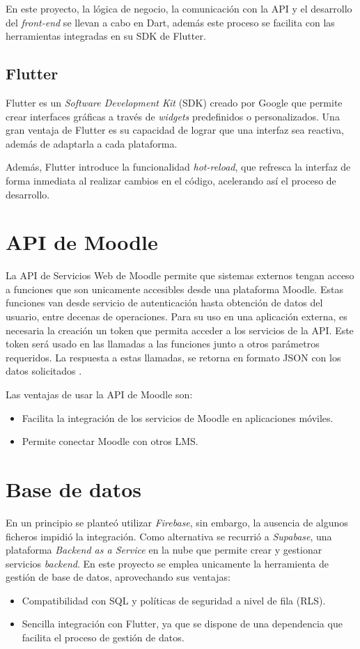 En este proyecto, la lógica de negocio, la comunicación con la API y el desarrollo del \textit{front-end} se llevan a cabo en Dart, además este proceso se facilita con las herramientas integradas en su SDK de Flutter.

\subsection{Flutter}

Flutter es un \textit{Software Development Kit} (SDK) creado por Google que permite crear interfaces gráficas a través de \textit{widgets} predefinidos o personalizados. Una gran ventaja de Flutter es su capacidad de lograr que una interfaz sea reactiva, además de adaptarla a cada plataforma.\cite{flutter}

Además, Flutter introduce la funcionalidad \textit{hot-reload}, que refresca la interfaz de forma inmediata al realizar cambios en el código, acelerando así el proceso de desarrollo.

\section{API de Moodle}
La API de Servicios Web de Moodle permite que sistemas externos tengan acceso a funciones que son unicamente accesibles desde una plataforma Moodle. Estas funciones van desde servicio de autenticación hasta obtención de datos del usuario, entre decenas de operaciones. Para su uso en una aplicación externa, es necesaria la creación un token que permita acceder a los servicios de la API. Este token será usado en las llamadas a las funciones junto a otros parámetros requeridos. La respuesta a estas llamadas, se retorna en formato JSON con los datos solicitados \cite{api_moodle}.

Las ventajas de usar la API de Moodle son:
\begin{itemize}
    \item Facilita la integración de los servicios de Moodle en aplicaciones móviles.
    \item Permite conectar Moodle con otros LMS.
\end{itemize}

\section{Base de datos}
En un principio se planteó utilizar \textit{Firebase}, sin embargo, la ausencia de algunos ficheros impidió la integración. Como alternativa se recurrió a \textit{Supabase}, una plataforma \textit{Backend as a Service} en la nube que permite crear y gestionar servicios \textit{backend}.
En este proyecto se emplea unicamente la herramienta de gestión de base de datos, aprovechando sus ventajas:
\begin{itemize}
    \item Compatibilidad con SQL y políticas de seguridad a nivel de fila (RLS).
    \item Sencilla integración con Flutter, ya que se dispone de una dependencia que facilita el proceso de gestión de datos.
\end{itemize}

